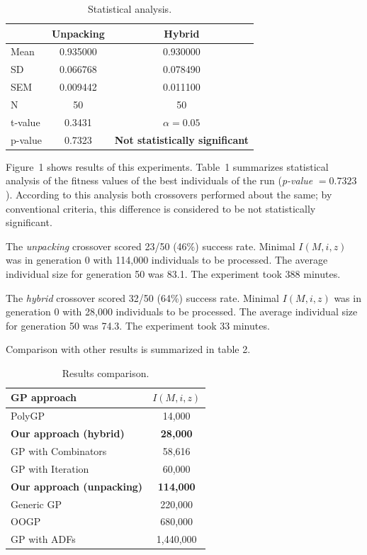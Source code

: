 \documentclass{sig-alternate}
\begin{document}
\begin{table}[t]
\centering
\begin{tabular}{|l|cc|}
\hline
& Unpacking & Hybrid \\
\hline
Mean & 0.935000	& 0.930000 \\
SD	 & 0.066768	& 0.078490 \\
SEM	 & 0.009442	& 0.011100 \\
N	 & 50    & 50    \\
\hline
t-value &  0.3431 & $\alpha = 0.05$\\
p-value &  0.7323 &  \textbf{Not statistically significant}\\
\hline
\end{tabular}
\caption{Statistical analysis.}
\end{table}

Figure~1 shows results of this experiments. 
Table~1 summarizes statistical analysis
of the fitness values of the best individuals of the run 
(\textit{p-value} $ = 0.7323$).  
According to this analysis both crossovers performed about the same;
by conventional criteria, this difference is considered to be not 
statistically significant.

The \textit{unpacking} crossover scored 23/50 (46\%) success rate. 
Minimal $I(M,i,z)$ was in generation 0 with 114,000 individuals to be processed.
The average individual size for generation 50 was 83.1.
The experiment took 388 minutes.

The \textit{hybrid} crossover scored 32/50 (64\%) success rate. 
Minimal $I(M,i,z)$ was in generation 0 with 28,000 individuals to be processed.
The average individual size for generation 50 was 74.3.
The experiment took 33 minutes.

Comparison with other results is summarized in table 2.


\begin{table}[t]
\centering
\begin{tabular}{|l|c|}
\hline
GP approach &  $I(M,i,z)$ \\
\hline
PolyGP                 &  14,000       \\
\textbf{Our approach (hybrid)}&  \textbf{28,000} \\
GP with Combinators	   &  58,616        \\
GP with Iteration      &  60,000       \\
\textbf{Our approach (unpacking)}&  \textbf{114,000} \\
Generic GP	           &  220,000      \\
OOGP	               &  680,000      \\
GP with ADFs           &1,440,000      \\
\hline
\end{tabular}
\caption{Results comparison.}
\end{table}
\end{document}
